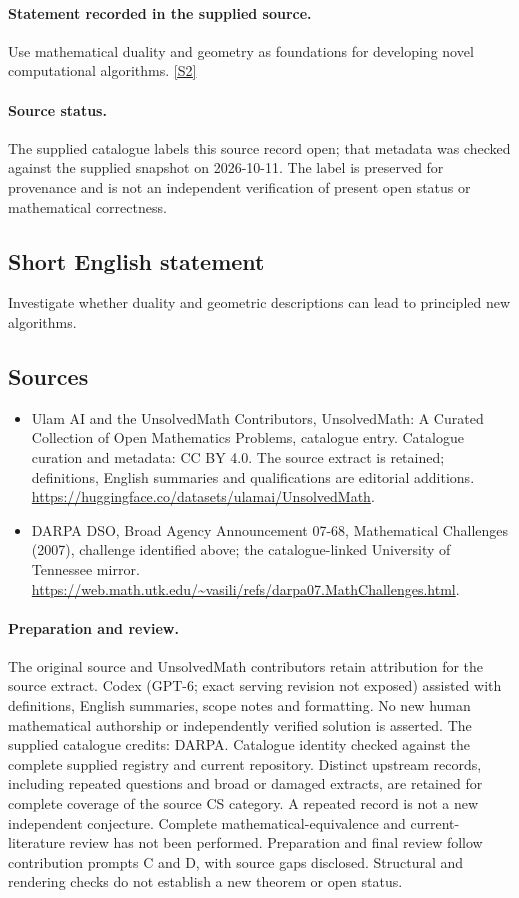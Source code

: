 \documentclass[11pt]{article}
\begin{document}
\paragraph{Statement recorded in the supplied source.}
Use mathematical duality and geometry as foundations for developing novel computational algorithms. \href{https://web.math.utk.edu/~vasili/refs/darpa07.MathChallenges.html}{[S2]}
\paragraph{Source status.}
The supplied catalogue labels this source record open; that metadata was checked against the supplied snapshot on 2026-10-11. The label is preserved for provenance and is not an independent verification of present open status or mathematical correctness.
\subsection{Short English statement}
Investigate whether duality and geometric descriptions can lead to principled new algorithms.
\subsection{Sources}
\begin{itemize}
\item[S1] Ulam AI and the UnsolvedMath Contributors, UnsolvedMath: A Curated Collection of Open Mathematics Problems, catalogue entry. Catalogue curation and metadata: CC BY 4.0. The source extract is retained; definitions, English summaries and qualifications are editorial additions.
\url{https://huggingface.co/datasets/ulamai/UnsolvedMath}.
\item[S2] DARPA DSO, Broad Agency Announcement 07-68, Mathematical Challenges (2007), challenge identified above; the catalogue-linked University of Tennessee mirror.
\url{https://web.math.utk.edu/~vasili/refs/darpa07.MathChallenges.html}.
\end{itemize}
\paragraph{Preparation and review.}
The original source and UnsolvedMath contributors retain attribution for the source extract. Codex (GPT-6; exact serving revision not exposed) assisted with definitions, English summaries, scope notes and formatting. No new human mathematical authorship or independently verified solution is asserted. The supplied catalogue credits: DARPA. Catalogue identity checked against the complete supplied registry and current repository. Distinct upstream records, including repeated questions and broad or damaged extracts, are retained for complete coverage of the source CS category. A repeated record is not a new independent conjecture. Complete mathematical-equivalence and current-literature review has not been performed. Preparation and final review follow contribution prompts C and D, with source gaps disclosed. Structural and rendering checks do not establish a new theorem or open status.
\label{end:statement}
\end{document}
